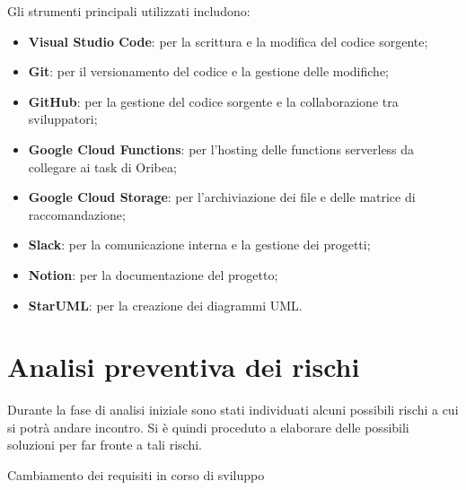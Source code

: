 Gli strumenti principali utilizzati includono:
\begin{itemize}
    \item \textbf{Visual Studio Code}: per la scrittura e la modifica del codice sorgente;
    \item \textbf{Git}: per il versionamento del codice e la gestione delle modifiche;
    \item \textbf{GitHub}: per la gestione del codice sorgente e la collaborazione tra sviluppatori;
    \item \textbf{Google Cloud Functions}: per l'hosting delle functions serverless da collegare ai task di Oribea;
    \item \textbf{Google Cloud Storage}: per l'archiviazione dei file e delle matrice di raccomandazione;
    \item \textbf{Slack}: per la comunicazione interna e la gestione dei progetti;
    \item \textbf{Notion}: per la documentazione del progetto;
    \item \textbf{StarUML}: per la creazione dei diagrammi UML.
\end{itemize}

\section{Analisi preventiva dei rischi}

Durante la fase di analisi iniziale sono stati individuati alcuni possibili rischi a cui si potrà andare incontro.
Si è quindi proceduto a elaborare delle possibili soluzioni per far fronte a tali rischi.\\

\begin{risk}{Cambiamento dei requisiti in corso di sviluppo}
    \label{risk:requirements-change} 
\end{risk}

